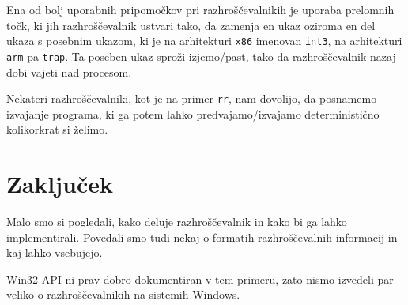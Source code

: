\documentclass[a4paper,notitlepage]{article}
\newcommand{\code}[1]{\texttt{#1}}
\begin{document}
Ena od bolj uporabnih pripomočkov pri razhroščevalnikih je uporaba prelomnih točk, ki jih razhroščevalnik ustvari tako, da zamenja en ukaz oziroma en del ukaza s posebnim ukazom, ki je na arhitekturi \code{x86} imenovan \code{int3}, na arhitekturi \code{arm} pa 
\code{trap}. Ta poseben ukaz sproži izjemo/past, tako da razhroščevalnik nazaj dobi vajeti nad procesom.

Nekateri razhroščevalniki, kot je na primer \href{https://rr-project.org/}{\code{rr}}, nam dovolijo, da posnamemo izvajanje programa, ki ga potem lahko predvajamo/izvajamo deterministično kolikorkrat si želimo.

\section{Zaključek}
Malo smo si pogledali, kako deluje razhroščevalnik in kako bi ga lahko implementirali. Povedali smo tudi nekaj o formatih razhroščevalnih informacij in kaj lahko vsebujejo.

Win32 API ni prav dobro dokumentiran v tem primeru, zato nismo izvedeli par veliko o razhroščevalnikih na sistemih Windows.

\nocite{*} %


\end{document}
